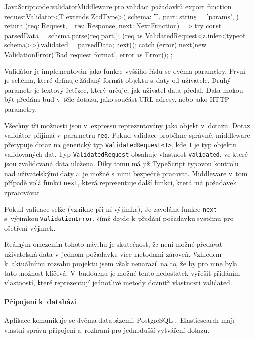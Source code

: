 \documentclass[
  tables=false,
  glossaries,
  index
]{kidiplom}
\begin{document}
\begin{kicode}{JavaScript}{code:validator}{Middleware pro validaci požadavků}
export function requestValidator<T extends ZodType>(
  schema: T,
  part: string = 'params',
) {
  return (req: Request, _res: Response, next: NextFunction) => {
    try {
      const parsedData = schema.parse(req[part]);
      (req as ValidatedRequest<z.infer<typeof schema>>).validated = parsedData;
      next();
    } catch (error) {
      next(new ValidationError('Bad request format', error as Error));
    }
  };
}
\end{kicode}

Validátor je implementován jako funkce vyššího řádu se dvěma parametry. První je schéma, které definuje žádaný formát objektu s~daty od uživatele. Druhý parametr je textový řetězec, který určuje, jak uživatel data předal. Data mohou být předána buď v~těle dotazu, jako součást URL adresy, nebo jako HTTP parametry.

Všechny tři možnosti jsou v~expressu reprezentovány jako objekt v~dotazu. Dotaz validátor přijímá v~parametru \texttt{req}. Pokud validace proběhne správně, middleware přetypuje dotaz na generický typ \texttt{ValidatedRequest<T>}, kde \texttt{T} je typ objektu validovaných dat. Typ \texttt{ValidatedRequest} obsahuje vlastnost \texttt{validated}, ve které jsou zvalidovaná data uložena. Díky tomu má již TypeScript typovou kontrolu nad uživatelskými daty a~je možné s~nimi bezpečně pracovat. Middleware v~tom případě volá funkci \texttt{next}, která reprezentuje další funkci, která má požadavek zpracovávat.

Pokud validace selže (vznikne při ní výjimka), Je zavolána funkce \texttt{next} s~výjimkou \texttt{ValidationError}, čímž dojde k~předání požadavku systému pro ošetření výjimek.

Reálným omezením tohoto návrhu je skutečnost, že není možné předávat uživatelská data v~jednom požadavku více metodami zároveň. Vzhledem k~aktuálnímu rozsahu projektu jsem však nenarazil na to, že by pro mne byla tato možnost klíčová. V~budoucnu je možné tento nedostatek vyřešit přidáním vlastností, které reprezentují jednotlivé metody dovnitř vlastnosti validated.

\paragraph{Připojení k~databázi}
Aplikace komunikuje se dvěma databázemi. PostgreSQL i~Elasticsearch mají vlastní správu připojení a~rozhraní pro jednodušší vytváření dotazů.
\end{document}
